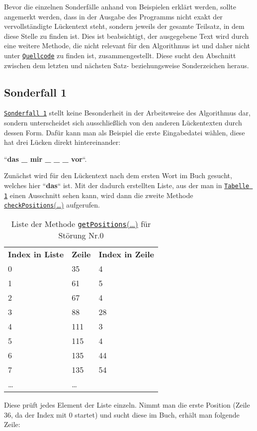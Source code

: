 \documentclass[a4paper, 10pt, ngerman]{scrartcl}
\begin{document}
Bevor die einzelnen Sonderfälle anhand von Beispielen erklärt werden,
sollte angemerkt werden,
dass in der Ausgabe des Programms nicht exakt der vervollständigte Lückentext steht,
sondern jeweils der gesamte Teilsatz,
in dem diese Stelle zu finden ist.
Dies ist beabsichtigt,
der ausgegebene Text wird durch eine weitere Methode,
die nicht relevant für den Algorithmus ist
und daher nicht unter \hyperref[sec:quellcode]{\texttt{Quellcode}} zu finden ist,
zusammengestellt.
Diese sucht den Abschnitt zwischen dem letzten und nächsten Satz- beziehungsweise Sonderzeichen heraus.

\subsection{Sonderfall 1}\label{sec:ersterSonderfall}
\hyperref[sonderfallEins]{\texttt{Sonderfall 1}} stellt keine Besonderheit in der Arbeitsweise des Algorithmus dar,
sondern unterscheidet sich ausschließlich von den anderen Lückentexten durch dessen Form.
Dafür kann man als Beispiel die erste Eingabedatei wählen,
diese hat drei Lücken direkt hintereinander:

``\textbf{das \_ mir \_ \_ \_ vor}``.

Zunächst wird für den Lückentext nach dem ersten Wort im Buch gesucht,
welches hier ``\textbf{das}`` ist.
Mit der dadurch erstellten Liste,
aus der man in \hyperref[tab:listeStoerung0]{\texttt{Tabelle 1}} einen Ausschnitt sehen kann,
wird dann die zweite Methode \hyperref[sec:checkPositions()]{\texttt{checkPositions}(\ldots)} aufgerufen.
\begin{table}\label{tab:listeStoerung0}
\centering
\begin{tabular}{lll}
	\textbf{Index in Liste} & \textbf{Zeile} & \textbf{Index in Zeile}\\
	0 & 35 & 4\\
	1 & 61 & 5\\
	2 & 67 & 4\\
	3 & 88 & 28\\
	4 & 111 & 3\\
	5 & 115 & 4\\
	6 & 135 & 44\\
	7 & 135 & 54\\
	\ldots & \ldots
\end{tabular}
\caption{Liste der Methode \hyperref[sec:getPositions()]{\texttt{getPositions}(\ldots)} für Störung Nr.0}
\end{table}
Diese prüft jedes Element der Liste einzeln.
Nimmt man die erste Position
(Zeile 36,
da der Index mit 0 startet)
und sucht diese im Buch,
erhält man folgende Zeile:
\end{document}
